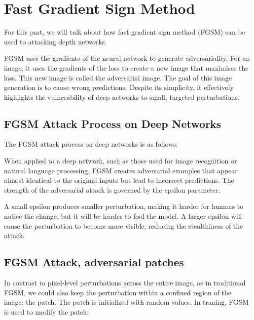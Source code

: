 \documentclass[conference]{IEEEtran}
\begin{document}





\section{Fast Gradient Sign Method}
For this part, we will talk about how fast gradient sign method (FGSM) can be used to attacking depth networks. 


FGSM uses the gradients of the neural network to generate adversariality. For an image, it uses the gradients of the loss to create a new image that maximises the loss. This new image is called the adversarial image. The goal of this image generation is to cause wrong predictions. Despite its simplicity, it effectively highlights the vulnerability of deep networks to small, targeted perturbations.


\subsection{FGSM Attack Process on Deep Networks}
The FGSM attack process on deep networks is as follows:

When applied to a deep network, such as those used for image recognition or natural language processing, FGSM creates adversarial examples that appear almost identical to the original inputs but lead to incorrect predictions.
The strength of the adversarial attack is governed by the epsilon parameter:

A small epsilon
 produces smaller perturbation, making it harder for humans to notice the change, but it will be harder to fool the model.
A larger epsilon
 will cause the perturbation to become more visible, reducing the stealthiness of the attack.

\subsection{FGSM Attack, adversarial patches}
In contrast to pixel-level perturbations across the entire image, as in traditional FGSM, we could also keep the perturbation within a confined region of the image: the patch. The patch is initialized with random values. In traning, FGSM is used to modify the patch:
\end{document}
